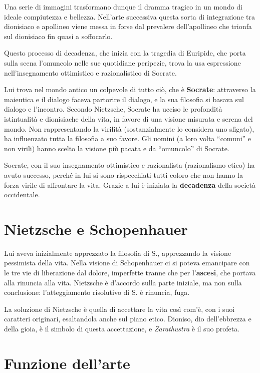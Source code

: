 \documentclass[a4paper, twoside, titlepage]{book}
\begin{document}
Una serie di immagini trasformano dunque il dramma tragico in un mondo di ideale compiutezza e bellezza. Nell'arte successiva questa sorta di integrazione tra dionisiaco e apollineo viene messa in forse dal prevalere dell'apollineo che trionfa sul dionisiaco fin quasi a soffocarlo.

Questo processo di decadenza, che inizia con la tragedia di Euripide, che porta sulla scena l'omuncolo nelle sue quotidiane peripezie, trova la usa espressione nell'insegnamento ottimistico e razionalistico di Socrate.

Lui trova nel mondo antico un colpevole di tutto ciò, che è \textbf{Socrate}: attraverso la maieutica e il dialogo faceva partorire il dialogo, e la sua filosofia si basava sul dialogo e l’incontro. Secondo Nietzsche, Socrate ha ucciso le profondità istintualità e dionisiache della vita, in favore di una visione misurata e serena del mondo.
Non rappresentando la virilità (sostanzialmente lo considera uno sfigato), ha influenzato tutta la filosofia a suo favore. Gli uomini (a loro volta “comuni” e non virili) hanno scelto la visione più pacata e da “omuncolo” di Socrate.

Socrate, con il suo insegnamento ottimistico e razionalista (razionalismo etico) ha avuto successo, perché in lui si sono rispecchiati tutti coloro che non hanno la forza virile di affrontare la vita. Grazie a lui è iniziata la \textbf{decadenza} della società occidentale.

\section{Nietzsche e Schopenhauer}

Lui aveva inizialmente apprezzato la filosofia di S., apprezzando la visione pessimista della vita.
Nella visione di Schopenhauer ci si poteva emancipare con le tre vie di liberazione dal dolore, imperfette tranne che per l’\textbf{ascesi}, che portava alla rinuncia alla vita.
Nietzsche è d’accordo sulla parte iniziale, ma non sulla conclusione: l’atteggiamento risolutivo di S. è rinuncia, fuga.

La soluzione di Nietzsche è quella di accettare la vita così com’è, con i suoi caratteri originari, esaltandola anche sul piano etico.
Dioniso, dio dell’ebbrezza e della gioia, è il simbolo di questa accettazione, e \textit{Zarathustra} è il suo profeta.

\section{Funzione dell’arte}
\end{document}
